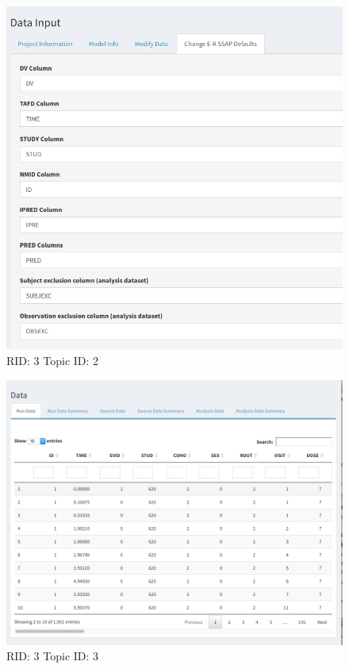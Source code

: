 \documentclass{article}
\begin{document}
\begin{figure}[hp]
\includegraphics[width=.8\textwidth]{screencaps/3-2-2.png}
\caption{RID: 3 Topic ID: 2}
\end{figure}

\begin{figure}[hp]
\includegraphics[width=.8\textwidth]{screencaps/3-3-1.png}
\caption{RID: 3 Topic ID: 3}
\end{figure}
\end{document}
